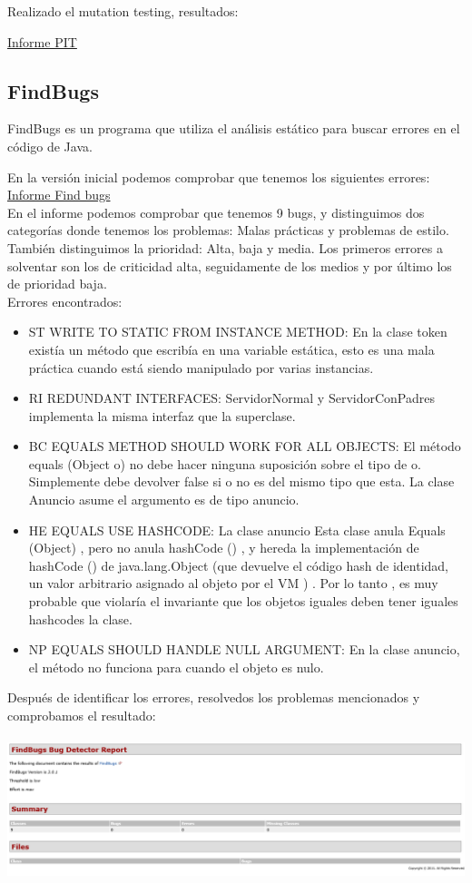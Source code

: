 \documentclass[12pt, a4paper, titlepage]{article}
\begin{document}
	Realizado el mutation testing, resultados:
	
	\href{Informes/PIT1/index.html}{Informe PIT} \\
	
	\subsection{FindBugs}
	
	FindBugs es un programa que utiliza el análisis estático para buscar errores en el código de Java.
	
	En la versión inicial podemos comprobar que tenemos los siguientes errores:
	\href{Informes/SiteTestInicial/findbugs.html}{Informe Find bugs} \\
	En el informe podemos comprobar que tenemos 9 bugs, y distinguimos dos categorías donde tenemos los problemas: Malas prácticas y problemas de estilo. También distinguimos la prioridad: Alta, baja y media.
	Los primeros errores a solventar son los de criticidad alta, seguidamente de los medios y por último los de prioridad baja.\\
	Errores encontrados:
		\begin{itemize}
			\item 	ST WRITE TO STATIC FROM INSTANCE METHOD: En la clase token existía un método que escribía en una variable estática, esto es una mala práctica cuando está siendo manipulado por varias instancias.
			\item 	RI REDUNDANT INTERFACES: ServidorNormal y ServidorConPadres implementa la misma interfaz que la superclase.
			\item BC EQUALS METHOD SHOULD WORK FOR ALL OBJECTS: El método equals (Object o) no debe hacer ninguna suposición sobre el tipo de o. Simplemente debe devolver false si o no es del mismo tipo que esta. La clase Anuncio asume el argumento es de tipo anuncio.
			\item HE EQUALS USE HASHCODE: La clase anuncio Esta clase anula Equals (Object) , pero no anula hashCode () , y hereda la implementación de hashCode () de java.lang.Object (que devuelve el código hash de identidad, un valor arbitrario asignado al objeto por el VM ) . Por lo tanto , es muy probable que violaría el invariante que los objetos iguales deben tener iguales hashcodes la clase.
			\item NP EQUALS SHOULD HANDLE NULL ARGUMENT: En la clase anuncio, el método no funciona para cuando el objeto es nulo.	
		\end{itemize}
		Después de identificar los errores, resolvedos los problemas mencionados y comprobamos el resultado:\\
		\\
	\includegraphics[width=15cm]{Imagenes/FindsBugs2.png} \\
\end{document}
